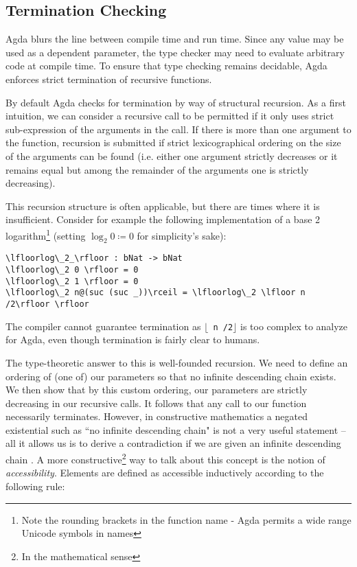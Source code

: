 \subsection{Termination Checking}
\label{sec:termination-checking}
Agda blurs the line between compile time and run time. Since any value may be used as a dependent parameter, the type checker may need to evaluate arbitrary code at compile time. To ensure that type checking remains decidable, Agda enforces strict termination of recursive functions.

By default Agda checks for termination by way of structural recursion. As a first intuition, we can consider a recursive call to be permitted if it only uses strict sub-expression of the arguments in the call. If there is more than one argument to the function, recursion is submitted if strict lexicographical ordering on the size of the arguments can be found (i.e. either one argument strictly decreases or it remains equal but among the remainder of the arguments one is strictly decreasing).

This recursion structure is often applicable, but there are times where it is insufficient. Consider for example the following implementation of a base 2 logarithm\footnote{Note the rounding brackets in the function name - Agda permits a wide range Unicode symbols in names} (setting $\log_2 0 \coloneqq 0$ for simplicity's sake):

\begin{lstlisting}[caption={Base 2 Logarithm},label={lst:tutorial:log},emph={log}]
\lfloorlog\_2_\rfloor : bNat -> bNat
\lfloorlog\_2 0 \rfloor = 0
\lfloorlog\_2 1 \rfloor = 0
\lfloorlog\_2 n@(suc (suc _))\rceil = \lfloorlog\_2 \lfloor n /2\rfloor \rfloor
\end{lstlisting}

The compiler cannot guarantee termination as \texttt{$\lfloor$ n /2$\rfloor$} is too complex to analyze for Agda, even though termination is fairly clear to humans.

The type-theoretic answer to this is well-founded recursion. We need to define an ordering of (one of) our parameters so that no infinite descending chain exists. We then show that by this custom ordering, our parameters are strictly decreasing in our recursive calls. It follows that any call to our function necessarily terminates. However, in constructive mathematics a negated existential such as ``no infinite descending chain" is not a very useful statement -- all it allows us is to derive a contradiction if we are given an infinite descending chain \cite{mietek:2020:minimal}. A more constructive\footnote{In the mathematical sense} way to talk about this concept is the notion of \emph{accessibility}. Elements are defined as accessible inductively according to the following rule:

